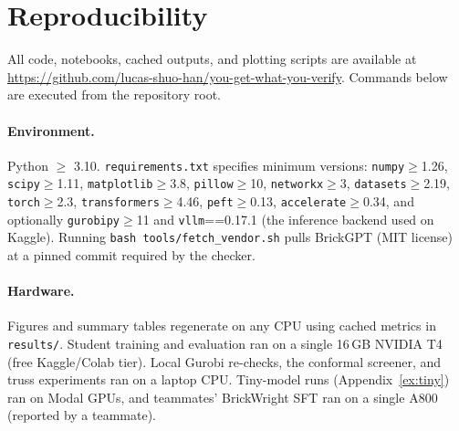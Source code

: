 \documentclass{article}
\begin{document}
\section{Reproducibility}
\label{app:repro}

All code, notebooks, cached outputs, and plotting scripts are available at \url{https://github.com/lucas-shuo-han/you-get-what-you-verify}. Commands below are executed from the repository root.

\paragraph{Environment.} Python $\geq$ 3.10. \texttt{requirements.txt} specifies minimum versions: \texttt{numpy}$\geq$1.26, \texttt{scipy}$\geq$1.11, \texttt{matplotlib}$\geq$3.8, \texttt{pillow}$\geq$10, \texttt{networkx}$\geq$3, \texttt{datasets}$\geq$2.19, \texttt{torch}$\geq$2.3, \texttt{transformers}$\geq$4.46, \texttt{peft}$\geq$0.13, \texttt{accelerate}$\geq$0.34, and optionally \texttt{gurobipy}$\geq$11 and \texttt{vllm}==0.17.1 (the inference backend used on Kaggle). Running \texttt{bash tools/fetch\_vendor.sh} pulls BrickGPT (MIT license) at a pinned commit required by the checker.

\paragraph{Hardware.} Figures and summary tables regenerate on any CPU using cached metrics in \texttt{results/}. Student training and evaluation ran on a single 16\,GB NVIDIA T4 (free Kaggle/Colab tier). Local Gurobi re-checks, the conformal screener, and truss experiments ran on a laptop CPU. Tiny-model runs (Appendix~\ref{ex:tiny}) ran on Modal GPUs, and teammates' BrickWright SFT ran on a single A800 (reported by a teammate).
\end{document}
